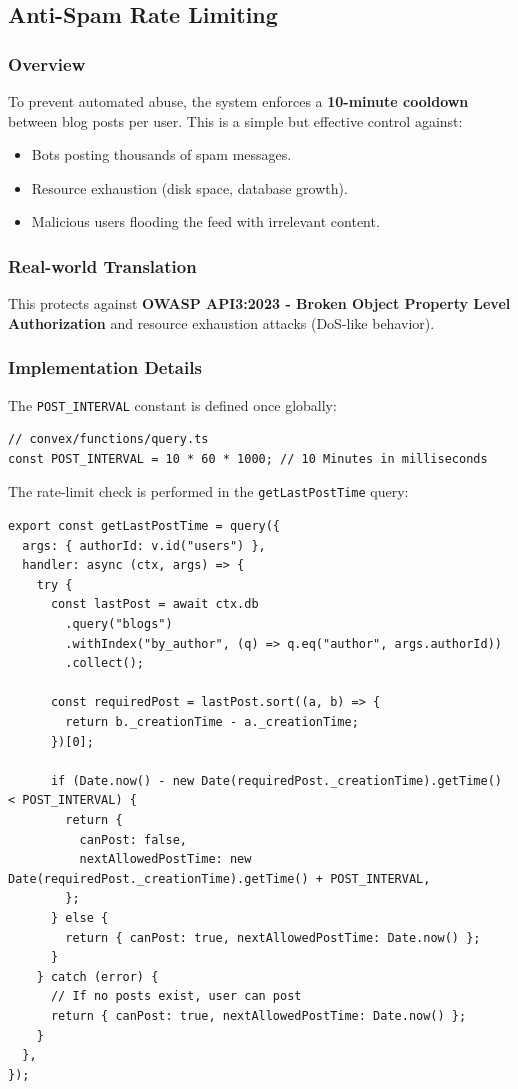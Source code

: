 \documentclass[11pt,a4paper]{article}
\begin{document}
\subsection{Anti-Spam Rate Limiting}

\subsubsection{Overview}
To prevent automated abuse, the system enforces a \textbf{10-minute cooldown} between blog posts per user. This is a simple but effective control against:
\begin{itemize}
    \item Bots posting thousands of spam messages.
    \item Resource exhaustion (disk space, database growth).
    \item Malicious users flooding the feed with irrelevant content.
\end{itemize}

\subsubsection{Real-world Translation}
This protects against \textbf{OWASP API3:2023 - Broken Object Property Level Authorization} and resource exhaustion attacks (DoS-like behavior).

\subsubsection{Implementation Details}
The \texttt{POST\_INTERVAL} constant is defined once globally:
\begin{lstlisting}
// convex/functions/query.ts
const POST_INTERVAL = 10 * 60 * 1000; // 10 Minutes in milliseconds
\end{lstlisting}

The rate-limit check is performed in the \texttt{getLastPostTime} query:
\begin{lstlisting}
export const getLastPostTime = query({
  args: { authorId: v.id("users") },
  handler: async (ctx, args) => {
    try {
      const lastPost = await ctx.db
        .query("blogs")
        .withIndex("by_author", (q) => q.eq("author", args.authorId))
        .collect();
      
      const requiredPost = lastPost.sort((a, b) => {
        return b._creationTime - a._creationTime;
      })[0];
      
      if (Date.now() - new Date(requiredPost._creationTime).getTime() < POST_INTERVAL) {
        return {
          canPost: false,
          nextAllowedPostTime: new Date(requiredPost._creationTime).getTime() + POST_INTERVAL,
        };
      } else {
        return { canPost: true, nextAllowedPostTime: Date.now() };
      }
    } catch (error) {
      // If no posts exist, user can post
      return { canPost: true, nextAllowedPostTime: Date.now() };
    }
  },
});
\end{lstlisting}
\end{document}
